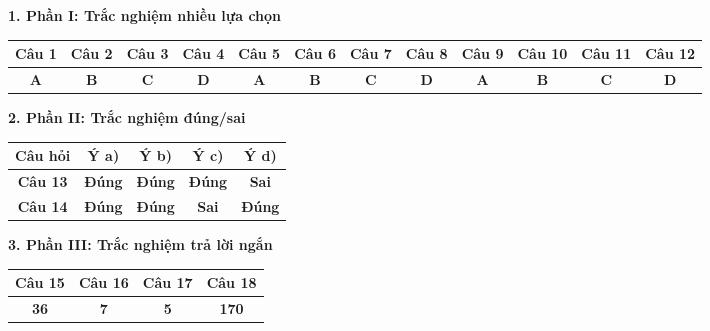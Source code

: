 \documentclass[12pt,a4paper]{article}
\begin{document}
\vspace{0.2cm}
\textbf{1. Phần I: Trắc nghiệm nhiều lựa chọn}
\begin{center}
{\setlength{\tabcolsep}{2.5pt}\small
\begin{tabular}{|c|c|c|c|c|c|c|c|c|c|c|c|}
\hline
\textbf{Câu 1} & \textbf{Câu 2} & \textbf{Câu 3} & \textbf{Câu 4} & \textbf{Câu 5} & \textbf{Câu 6} & \textbf{Câu 7} & \textbf{Câu 8} & \textbf{Câu 9} & \textbf{Câu 10} & \textbf{Câu 11} & \textbf{Câu 12} \\
\hline
\textbf{A} & \textbf{B} & \textbf{C} & \textbf{D} & \textbf{A} & \textbf{B} & \textbf{C} & \textbf{D} & \textbf{A} & \textbf{B} & \textbf{C} & \textbf{D} \\
\hline
\end{tabular}}
\end{center}

\vspace{0.2cm}
\textbf{2. Phần II: Trắc nghiệm đúng/sai}
\begin{center}
\begin{tabular}{|c|c|c|c|c|}
\hline
\textbf{Câu hỏi} & \textbf{Ý a)} & \textbf{Ý b)} & \textbf{Ý c)} & \textbf{Ý d)} \\
\hline
\textbf{Câu 13} & \textbf{Đúng} & \textbf{Đúng} & \textbf{Đúng} & \textbf{Sai} \\
\hline
\textbf{Câu 14} & \textbf{Đúng} & \textbf{Đúng} & \textbf{Sai} & \textbf{Đúng} \\
\hline
\end{tabular}
\end{center}

\vspace{0.2cm}
\textbf{3. Phần III: Trắc nghiệm trả lời ngắn}
\begin{center}
\begin{tabular}{|c|c|c|c|}
\hline
\textbf{Câu 15} & \textbf{Câu 16} & \textbf{Câu 17} & \textbf{Câu 18} \\
\hline
\textbf{36} & \textbf{7} & \textbf{5} & \textbf{170} \\
\hline
\end{tabular}
\end{center}
\end{document}
